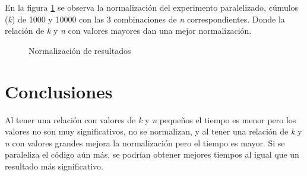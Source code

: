 \documentclass{article}
\begin{document}
En la figura \ref{fig3} se observa la normalización del experimento paralelizado, cúmulos (\textit{k}) de 1000 y 10000 con las 3 combinaciones de \textit{n} correspondientes. Donde la relación de \textit{k} y \textit{n} con valores mayores dan una mejor normalización.

\begin{figure}[h!]
\centering
{}
\caption{Normalización de resultados} \label{fig3}
\end{figure}


\newpage
\section{Conclusiones}
Al tener una relación con valores de  \textit{k} y \textit{n} pequeños el tiempo es menor pero los valores no son muy significativos, no se normalizan, y al tener una relación de  \textit{k} y \textit{n} con valores grandes mejora la normalización pero el tiempo es mayor. Si se paraleliza el código aún más, se podrían obtener mejores tiempos al igual que un resultado más significativo.
\end{document}
